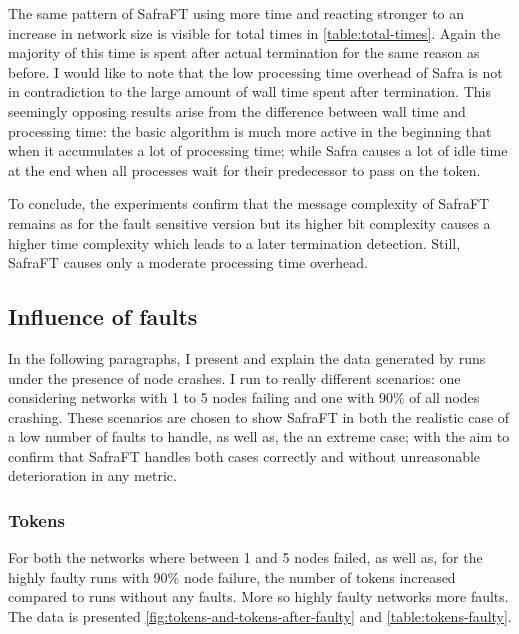 The same pattern of SafraFT using more time and reacting stronger to an increase in network size is visible for total times in \cref{table:total-times}.
Again the majority of this time is spent after actual termination for the same reason as before.
I would like to note that the low processing time overhead of Safra is not in contradiction to the large amount of wall time spent after termination.
This seemingly opposing results arise from the difference between wall time and processing time: the basic algorithm is much more active in the beginning that when it accumulates a lot of processing time; while Safra causes a lot of idle time at the end when all processes wait for their predecessor to pass on the token.

To conclude, the experiments confirm that the message complexity of SafraFT remains as for the fault sensitive version but its higher bit complexity causes a higher time complexity which leads to a later termination detection. 
Still, SafraFT causes only a moderate processing time overhead.

\subsection{Influence of faults}
In the following paragraphs, I present and explain the data generated by runs under the presence of node crashes.
I run to really different scenarios: one considering networks with 1 to 5 nodes failing and one with 90\% of all nodes crashing.
These scenarios are chosen to show SafraFT in both the realistic case of a low number of faults to handle, as well as, the an extreme case; with the aim to confirm that SafraFT handles both cases correctly and
without unreasonable deterioration in any metric.

\subsubsection{Tokens}
\label{ssec:tokens-faulty}
For both the networks where between 1 and 5 nodes failed, as well as, for the highly faulty runs with 90\% node failure, the number of tokens increased compared to runs without any faults.
More so highly faulty networks more faults. The data is presented \cref{fig:tokens-and-tokens-after-faulty} and \cref{table:tokens-faulty}. %

